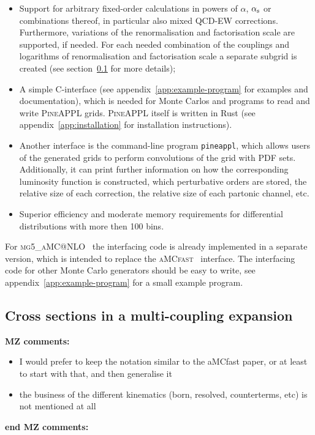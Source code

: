 \begin{itemize}
\item Support for arbitrary fixed-order calculations in powers of $\alpha$, $\alpha_\mathrm{s}$ or combinations thereof, in particular also mixed QCD-EW corrections.
Furthermore, variations of the renormalisation and factorisation scale are supported, if needed.
For each needed combination of the couplings and logarithms of renormalisation and factorisation scale a separate subgrid is created (see section~\ref{sec:multi-coupling-expansion} for more details);
\item A simple \textsc{C}-interface (see appendix~\ref{app:example-program} for examples and documentation), which is needed for Monte Carlos and programs to read and write \textsc{PineAPPL} grids.
\textsc{PineAPPL} itself is written in Rust (see appendix~\ref{app:installation} for installation instructions).
\item Another interface is the command-line program \texttt{pineappl}, which allows users of the generated grids to perform convolutions of the grid with PDF sets.
Additionally, it can print further information on how the corresponding luminosity function is constructed, which perturbative orders are stored, the relative size of each correction, the relative size of each partonic channel, etc.
\item Superior efficiency and moderate memory requirements for differential distributions with more then 100 bins.
\end{itemize}
For \textsc{mg5\_aMC@NLO}~\cite{Alwall:2014hca,Frederix:2018nkq} the interfacing code is already implemented in a separate version, which is intended to replace the \textsc{aMCfast}~\cite{Bertone:2014zva} interface.
The interfacing code for other Monte Carlo generators should be easy to write, see appendix~\ref{app:example-program} for a small example program.

\subsection{Cross sections in a multi-coupling expansion}
\label{sec:multi-coupling-expansion}
{\bf MZ comments:}
\begin{itemize}
    \item I would prefer to keep the notation similar to the aMCfast paper, or at least to start with that, and then generalise it
    \item the business of the different kinematics (born, resolved, counterterms, etc) is not mentioned at all
\end{itemize}
{\bf end MZ comments:}

